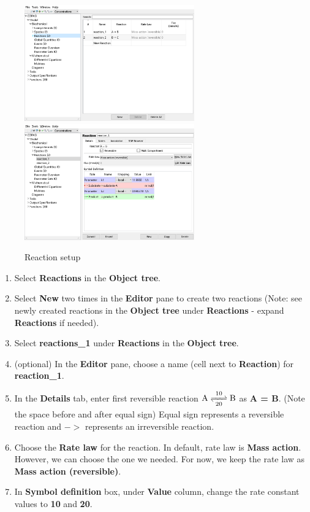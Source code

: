 \documentclass[10pt]{article}
\theoremstyle{definition}
\theoremstyle{remark}
\begin{document}
\begin{enumerate}
		\begin{figure}[!htb]
			\centering
			\includegraphics[height=5cm]{Images/3a.png}
			\includegraphics[height=5cm]{Images/3b.png}
			\caption{Reaction setup}
			\label{3png}
		\end{figure}
		\begin{enumerate} 
			\item Select \textbf{Reactions} in the \textbf{Object tree}.
			\item Select \textbf{New} two times in the \textbf{Editor} pane to create two reactions (Note: see newly created reactions in the \textbf{Object tree} under \textbf{Reactions} -  expand \textbf{Reactions} if needed).
			\item Select \textbf{reactions\_1} under \textbf{Reactions} in the \textbf{Object tree}.
			\item (optional) In the \textbf{Editor} pane, choose a name (cell next to \textbf{Reaction}) for \textbf{reaction\_1}.
			\item In the \textbf{Details} tab, enter first reversible reaction $\ce{A <=>[10][20] B}$ as \textbf{A = B}. (Note the space before and after equal sign) Equal sign represents a reversible reaction and $-$$>$ represents an irreversible reaction.
			\item Choose the \textbf{Rate law} for the reaction. In default, rate law is \textbf{Mass action}. However, we can choose the one we needed. For now, we keep the rate law as \textbf{Mass action (reversible)}. 
			\item In \textbf{Symbol definition} box, under \textbf{Value} column, change the rate constant values to \textbf{10} and \textbf{20}.
$$
\end{enumerate}
\end{enumerate}
\end{document}
